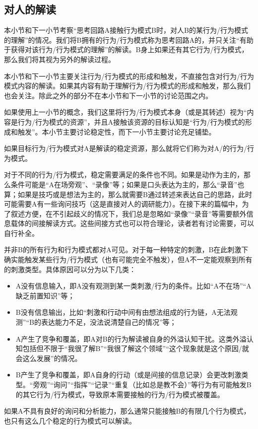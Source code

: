 \subsection{对人的解读}
\begin{explain}
本小节和下一小节考察“思考回路A接触行为模式B时，对人B的某行为/行为模式的理解”的情况。我们将B拥有的行为/行为模式称为思考回路A的，并只关注“有助于获得对该行为/行为模式的理解”的解读。B身上如果还有其它行为/行为模式，那么我们将其视为另外的解读过程。

本小节和下一小节主要关注行为/行为模式的形成和触发，不直接包含对行为/行为模式内容的解读。如果其内容有助于理解行为/行为模式的形成和触发，那么我们也会关注。除此之外的部分不在本小节和下一小节的讨论范围之内。
    
如果使用上一小节的概念，我们这里将行为/行为模式本身（或是其转述）视为“内容是行为/行为模式的资源”，并且A接触该资源的目标认知是“行为/行为模式的形成和触发”。本小节主要讨论稳定性，而下一小节主要讨论充足铺垫。
\end{explain}
如果目标行为/行为模式对A是解读的稳定资源，那么就将它们称为对A/的行为/行为模式。
\begin{explain}
对于不同的行为/行为模式，稳定需要满足的条件也不同。如果是动作为主的，那么条件可能是“A在场旁观”、“录像”等；如果是口头表达为主的，那么“录音”也算；如果是技巧或是想法为主的，那么就需要B通过转述来表达自己的思路，此时可能需要A有一些询问技巧（这是直接对人的调研能力）。在接下来的篇幅中，为了叙述方便，在不引起歧义的情况下，我们总是忽略如“录像”“录音”等需要额外信息载体的间接解读方式。这些间接方式也可以符合理论，读者若有讨论需要，可以自行补全。

并非B的所有行为和行为模式都对A可见。对于每一种特定的刺激，B在此刺激下确实能触发某些行为/行为模式（也有可能完全不触发），但A不一定能观察到所有的刺激类型。具体原因可以分为以下几类：
\begin{itemize}
\item A没有信息输入，即A没有观测到某一类刺激/行为的条件。比如“A不在场”“A缺乏前置知识”等；
\item B没有信息输出，比如“刺激和行动中间有由想法组成的行为链，A无法观测”“B的表达能力不足，没法说清楚自己的情况”等；
\item A产生了竞争和覆盖，即A对B的行为解读被自身的外溢认知干扰。这类外溢认知包括但不限于“我很了解B”“我很了解这个领域”“这个现象就是这个原因/就会这么发展”的情况。
\item B产生了竞争和覆盖，即A自身的行动（或是间接的信息记录）会更改刺激类型。“旁观”“询问”“指挥”“记录”“重复（比如总是教不会）”等行为有可能触发B的其它行为/行为模式，导致原本需要接触的行为/行为模式被覆盖。
\end{itemize}
如果A不具有良好的询问和分析能力，那么通常只能接触B的有限几个行为模式，也只有这么几个稳定的行为模式可以解读。
\end{explain}
